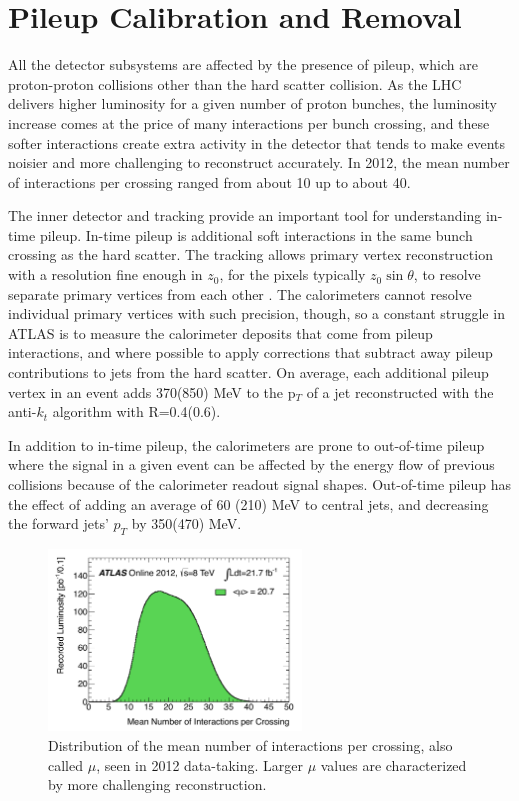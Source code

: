 
\section{Pileup Calibration and Removal}
\label{sec:pileup}
All the detector subsystems are affected by the presence of pileup, which are proton-proton collisions other than the hard scatter 
collision.  As the LHC delivers higher luminosity for a given number of proton bunches, the luminosity increase comes 
at the price of many interactions per bunch crossing, and these softer interactions create extra activity in the detector 
that tends to make events noisier and more challenging to reconstruct accurately.  In 2012, the mean number of 
interactions per crossing ranged from about 10 up to about 40.  

The inner detector and tracking provide an important tool for understanding in-time pileup.  In-time pileup 
is additional soft interactions in the same bunch crossing as the hard scatter.  The tracking allows primary vertex reconstruction 
with a resolution fine enough in $z_0$, for the pixels typically $z_0\sin\theta$, 
to resolve separate primary vertices from each other \cite{pileup_tracks}.   The calorimeters cannot resolve individual primary vertices with such precision, 
though, so a constant struggle in ATLAS is to measure the calorimeter deposits that come from pileup interactions, 
and where possible to apply corrections that subtract away pileup contributions to jets from the hard scatter.  On average,
each additional pileup vertex in an event adds 370(850) \cite{pileup} 
MeV to the p$_T$ of a jet reconstructed with the anti-$k_t$ algorithm with R=0.4(0.6).

In addition to in-time pileup, the calorimeters are prone to out-of-time pileup where 
the signal in a given event can be affected by the energy flow of previous collisions because of the 
calorimeter readout signal shapes.  Out-of-time pileup has the effect of adding an average of 60
(210) MeV to central jets, and decreasing the forward jets' $p_T$ by 350(470) MeV.  


\begin{figure}
    \center
	\includegraphics[width=0.6\textwidth]{ReconstructionPerformance/images/mu_2012-dec.pdf}
	\caption{Distribution of the mean number of interactions per crossing, also called $\mu$, seen in 2012 data-taking.  Larger $\mu$ values are characterized by more challenging reconstruction. 	\label{fig:mu_2012}  }
\end{figure}

